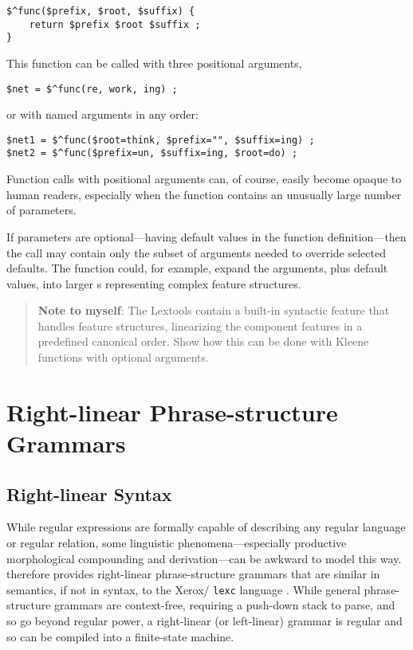 \begin{Verbatim}
$^func($prefix, $root, $suffix) {
	return $prefix $root $suffix ;
}
\end{Verbatim}

\noindent
This function can be called with three positional arguments,

\begin{Verbatim}
$net = $^func(re, work, ing) ;
\end{Verbatim}

\noindent
or with named arguments in any order:

\begin{Verbatim}
$net1 = $^func($root=think, $prefix="", $suffix=ing) ;
$net2 = $^func($prefix=un, $suffix=ing, $root=do) ;
\end{Verbatim}

\noindent
Function calls with positional arguments can, of course, easily become
opaque to human readers, especially when the function contains an unusually large number of parameters.

If parameters are optional---having default values in the function definition---then the call
may contain only the subset of arguments needed to override selected
defaults.  The function could, for example, expand the arguments, plus default
values, into larger \fsm{}s representing complex feature structures.

\begin{quote}
\textbf{Note to myself}: The  Lextools contain a
built-in syntactic
feature that handles feature structures, linearizing
the component features in a predefined canonical order.  Show how this
can be done with Kleene functions with optional arguments.
\end{quote}



\section{Right-linear Phrase-structure Grammars}

\subsection{Right-linear Syntax}

While regular expressions are formally capable of describing any
regular language or regular relation, some linguistic
phenomena---especially productive morphological compounding and
derivation---can be awkward to model this way.  \Kleene{}
therefore provides right-linear phrase-structure grammars that
are similar in semantics, if not in syntax, to the
Xerox/ \texttt{lexc} language \citep{beesley+karttunen:2003}.  While general phrase-structure
grammars are context-free, requiring a push-down stack to parse, and so go beyond
regular power, a right-linear (or left-linear) grammar is regular and so can be
compiled into a finite-state machine.  


